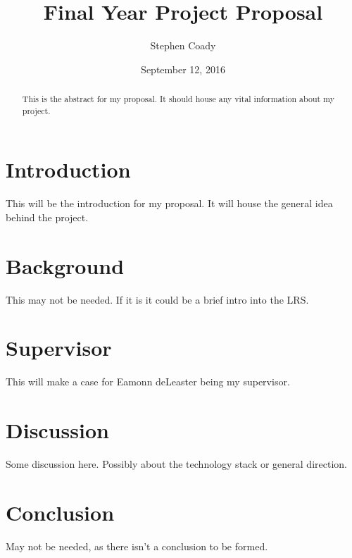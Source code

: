 \documentclass{article}
\author{Stephen Coady}
\title{Final Year Project Proposal}
\date{September 12, 2016}
\begin{document}
\maketitle 
\newpage

\begin{abstract}
This is the abstract for my proposal. It should house any vital information about my project.
\end{abstract}

\newpage

\tableofcontents

\newpage

\section{Introduction}

This will be the introduction for my proposal. It will house the general idea behind the project.

\section{Background}

This may not be needed. If it is it could be a brief intro into the LRS.

\section{Supervisor}

This will make a case for Eamonn deLeaster being my supervisor.

\section{Discussion}

Some discussion here. Possibly about the technology stack or general direction.

\section{Conclusion}

May not be needed, as there isn't a conclusion to be formed. 
\end{document}

